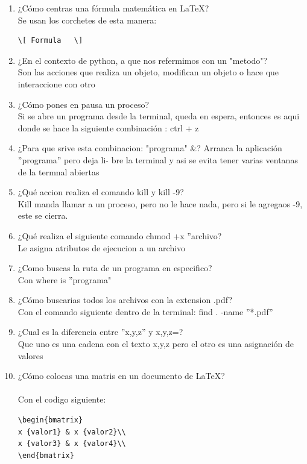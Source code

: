 \documentclass[letterpaper, 12pt, oneside]{article}%
\begin{document}
\begin{enumerate}
	\item ¿Cómo centras una fórmula matemática en \LaTeX?\\
	Se usan los corchetes de esta manera:  \begin{lstlisting}
\[ Formula   \]
	\end{lstlisting}
	
	\item ¿En el contexto de python, a que nos refermimos con un "metodo"?\\
	Son las acciones que realiza un objeto, modifican un
	objeto o hace que interaccione con otro
	
	\item ¿Cómo pones en pausa un proceso?\\
	Si se abre un programa desde la terminal, queda en espera, entonces es aqui donde se hace la siguiente combinación : ctrl + z
	
	\item ¿Para que srive esta combinacion: "programa" \&?
	Arranca la aplicación ”programa” pero deja li-
	bre la terminal y asi se evita tener varias ventanas de la termnal
	abiertas
	\item ¿Qué accion realiza el comando kill y kill -9?\\
Kill manda llamar a un proceso, pero no le hace nada, pero si le agregaos -9, este se cierra.
	\item ¿Qué realiza el siguiente comando chmod +x ”archivo?\\
		Le asigna atributos de ejecucion a un archivo
		
	\item ¿Como buscas la ruta de un programa en especifico?\\
	Con where is ”programa"
	
	\item ¿Cómo buscarias todos los archivos con la extension .pdf?\\
	Con el comando siguiente dentro de la terminal: find . -name ”*.pdf”
	
	\item ¿Cual es la diferencia entre ”x,y,z” y x,y,z=?\\
Que uno es una cadena con el texto x,y,z pero el otro es una asignación de valores

	\item ¿Cómo colocas una matris en un documento de \LaTeX?\\
	\\
	Con el codigo siguiente:
\begin{verbatim} 
\begin{bmatrix}
x {valor1} & x {valor2}\\
x {valor3} & x {valor4}\\
\end{bmatrix}
\end{verbatim}



\end{enumerate}
\end{document}
